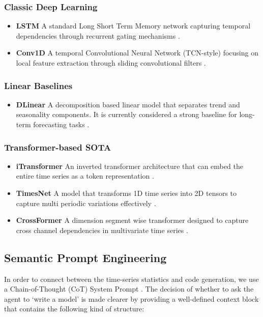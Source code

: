 \documentclass{article}
\begin{document}
\subsubsection{Classic Deep Learning}

\begin{itemize}
    \item \textbf{LSTM} A standard Long Short Term Memory network capturing temporal dependencies through recurrent gating mechanisms \cite{lstm}.

    \item \textbf{Conv1D} A temporal Convolutional Neural Network (TCN-style) focusing on local feature extraction through sliding convolutional filters \cite{bai2018empirical}.
\end{itemize}

\subsubsection{Linear Baselines}

\begin{itemize}
    \item \textbf{DLinear} A decomposition based linear model that separates trend and seasonality components. It is currently considered a strong baseline for long-term forecasting tasks \cite{zeng2022are}.
\end{itemize}

\subsubsection{Transformer-based SOTA}

\begin{itemize}
    \item \textbf{iTransformer} An inverted transformer architecture that can embed the entire time series as a token representation \cite{liu2023itransformer}.

    \item \textbf{TimesNet} A model that transforms 1D time series into 2D tensors to capture multi periodic variations effectively \cite{wu2022timesnet}.

    \item \textbf{CrossFormer} A dimension segment wise transformer designed to capture cross channel dependencies in multivariate time series \cite{zhang2023crossformer}.
\end{itemize}

\subsection{Semantic Prompt Engineering}
In order to connect between the time-series statistics and code generation, we use a Chain-of-Thought (CoT) System Prompt \cite{wei2022chain}.  The decision of whether to ask the agent to ‘write a model’ is made clearer by providing a well-defined context block that contains the following kind of structure:
\end{document}
